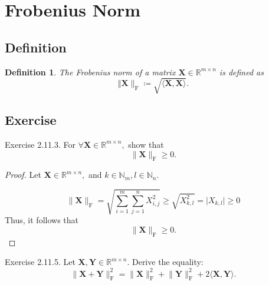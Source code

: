 \documentclass{article}
\theoremstyle{plain}
\newtheorem{dfn}{Definition}[subsection]
\begin{document}
\section{Frobenius Norm}

\subsection{Definition}

\begin{dfn}
	The Frobenius norm of a matrix $\bm{X} \in \mathbb{R}^{m \times n}$ is defined as
	\begin{equation*}
		\Vert \bm{X} \rVert_{\mathrm{F}} \coloneq \sqrt{\langle \bm{X} , \bm{X} \rangle} .
	\end{equation*}
\end{dfn}


\subsection{Exercise}

\begin{itembox}[l]{Exercise 2.11.3.}
	For
	\begin{math}
		\forall \bm{X} \in \mathbb{R}^{m \times n} ,
	\end{math}
	show that
	\begin{equation*}
		\lVert \bm{X} \rVert_\mathrm{F} \geq 0 .
	\end{equation*}
\end{itembox}


\begin{proof}
	Let
	\begin{math}
		\bm{X} \in \mathbb{R}^{m \times n} ,
	\end{math}
	and
	\begin{math}
		k \in \mathbb{N}_m , l \in \mathbb{N}_n .
	\end{math}
	
	\begin{equation*}
		\lVert \bm{X} \rVert_\mathrm{F} = \sqrt{\sum_{i=1}^m \sum_{j=1}^n X_{i,j}^2}
		\geq \sqrt{X_{k,l}^2}
		= \lvert X_{k,l} \rvert \geq 0
	\end{equation*}
	Thus, it follows that
	\begin{equation*}
		\lVert \bm{X} \rVert_\mathrm{F} \geq 0 .
	\end{equation*}
\end{proof}

\begin{itembox}[l]{Exercise 2.11.5.}
	Let
	\begin{math}
		\bm{X} , \bm{Y} \in \mathbb{R}^{m \times n} .
	\end{math}
	Derive the equality:
	\begin{equation}
		\label{ex2115}
		\lVert \bm{X} + \bm{Y} \rVert_\mathrm{F}^2 = \lVert \bm{X} \rVert_\mathrm{F}^2
		+ \lVert \bm{Y} \rVert_\mathrm{F}^2 + 2 \langle \bm{X} , \bm{Y} \rangle .
	\end{equation}
\end{itembox}
\end{document}
